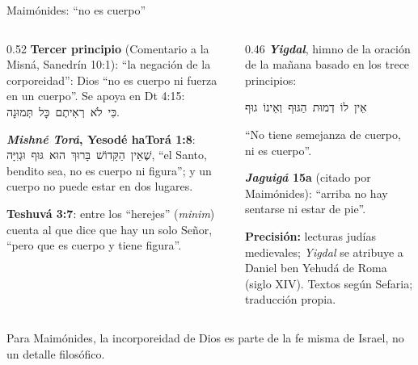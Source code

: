 \documentclass[hyperref={bookmarks=false},aspectratio=169]{beamer}
\newcommand{\heb}[1]{\mbox{\foreignlanguage{hebrew}{#1}}}
\newcommand{\precision}[1]{{\footnotesize\color{gris}\textbf{Precisión:} #1}}
\begin{document}
\begin{frame}{Maimónides: ``no es cuerpo''}
\begin{columns}[t,onlytextwidth]
\begin{column}{0.52\textwidth}\scriptsize
\textbf{Tercer principio} (Comentario a la Misná, Sanedrín 10:1): ``la negación de la corporeidad'': Dios ``no es cuerpo ni fuerza en un cuerpo''. Se apoya en Dt 4:15: \heb{כִּי לֹא רְאִיתֶם כָּל תְּמוּנָה}.\par\smallskip
\textbf{\emph{Mishné Torá}, Yesodé haTorá 1:8}: \heb{שֶׁאֵין הַקָּדוֹשׁ בָּרוּךְ הוּא גּוּף וּגְוִיָּה}, ``el Santo, bendito sea, no es cuerpo ni figura''; y un cuerpo no puede estar en dos lugares.\par\smallskip
\textbf{Teshuvá 3:7}: entre los ``herejes'' (\emph{minim}) cuenta al que dice que hay un solo Señor, ``pero que es cuerpo y tiene figura''.
\end{column}
\begin{column}{0.46\textwidth}\scriptsize
\textbf{\emph{Yigdal}}, himno de la oración de la mañana basado en los trece principios:
\begin{center}\heb{אֵין לוֹ דְמוּת הַגּוּף וְאֵינוֹ גוּף}\end{center}
``No tiene semejanza de cuerpo, ni es cuerpo''.\par\smallskip
\textbf{\emph{Jaguigá} 15a} (citado por Maimónides): ``arriba no hay sentarse ni estar de pie''.\par\smallskip
\precision{lecturas judías medievales; \emph{Yigdal} se atribuye a Daniel ben Yehudá de Roma (siglo XIV). Textos según Sefaria; traducción propia.}
\end{column}
\end{columns}\par\medskip
\small\RaggedRight Para Maimónides, la incorporeidad de Dios es parte de la fe misma de Israel, no un detalle filosófico.
\end{frame}
\end{document}
